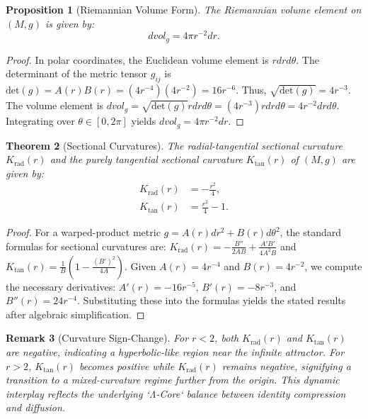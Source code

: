 \documentclass[12pt]{article}
\newtheorem{theorem}{Theorem}[section]
\newtheorem{proposition}[theorem]{Proposition}
\newtheorem{remark}[theorem]{Remark}
\begin{document}
\begin{proposition}[Riemannian Volume Form]
The Riemannian volume element on $(M, g)$ is given by:
\begin{equation}
dvol_g = 4\pi r^{-2} dr.
\end{equation}
\end{proposition}
\begin{proof}
In polar coordinates, the Euclidean volume element is $r dr d\theta$. The determinant of the metric tensor $g_{ij}$ is $\text{det}(g) = A(r)B(r) = (4r^{-4})(4r^{-2}) = 16r^{-6}$. Thus, $\sqrt{\text{det}(g)} = 4r^{-3}$. The volume element is $dvol_g = \sqrt{\text{det}(g)} r dr d\theta = (4r^{-3}) r dr d\theta = 4r^{-2} dr d\theta$. Integrating over $\theta \in [0, 2\pi]$ yields $dvol_g = 4\pi r^{-2} dr$.
\end{proof}

\begin{theorem}[Sectional Curvatures]
The radial-tangential sectional curvature $K_{\text{rad}}(r)$ and the purely tangential sectional curvature $K_{\text{tan}}(r)$ of $(M, g)$ are given by:
\begin{align}
K_{\text{rad}}(r) &= -\frac{r^2}{4}, \\
K_{\text{tan}}(r) &= \frac{r^2}{4} - 1.
\end{align}
\end{theorem}
\begin{proof}
For a warped-product metric $g = A(r)dr^2 + B(r)d\theta^2$, the standard formulas for sectional curvatures are:
$K_{\text{rad}}(r) = -\frac{B''}{2AB} + \frac{A'B'}{4A^2B}$ and $K_{\text{tan}}(r) = \frac{1}{B}\left(1 - \frac{(B')^2}{4A}\right)$.
Given $A(r) = 4r^{-4}$ and $B(r) = 4r^{-2}$, we compute the necessary derivatives: $A'(r) = -16r^{-5}$, $B'(r) = -8r^{-3}$, and $B''(r) = 24r^{-4}$. Substituting these into the formulas yields the stated results after algebraic simplification.
\end{proof}

\begin{remark}[Curvature Sign-Change]
For $r < 2$, both $K_{\text{rad}}(r)$ and $K_{\text{tan}}(r)$ are negative, indicating a hyperbolic-like region near the infinite attractor. For $r > 2$, $K_{\text{tan}}(r)$ becomes positive while $K_{\text{rad}}(r)$ remains negative, signifying a transition to a mixed-curvature regime further from the origin. This dynamic interplay reflects the underlying `Λ-Core` balance between identity compression and diffusion.
\end{remark}
\end{document}
